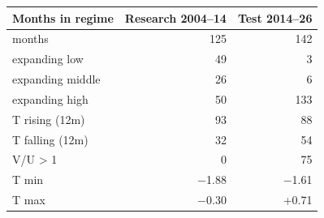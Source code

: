 \begin{tabular}{lrr}
\toprule
Months in regime & Research 2004--14 & Test 2014--26 \\
\midrule
months & 125 & 142 \\
expanding low & 49 & 3 \\
expanding middle & 26 & 6 \\
expanding high & 50 & 133 \\
T rising (12m) & 93 & 88 \\
T falling (12m) & 32 & 54 \\
V/U > 1 & 0 & 75 \\
T min & $-$1.88 & $-$1.61 \\
T max & $-$0.30 & +0.71 \\
\bottomrule
\end{tabular}
